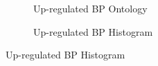\documentclass[12pt,letterpaper]{article}
\begin{document}
\begin{figure}[H]
\centering
\begin{subfigure}[b]{0.48\textwidth}
    \centering
    \caption{Up-regulated BP Ontology}
    \label{fig:enter-label}
\end{subfigure}
\begin{subfigure}[b]{0.48\textwidth}
    \centering
    \caption{Up-regulated BP Histogram}
    \label{fig:enter-label}
\end{subfigure}\par

\end{figure}
\end{document}

